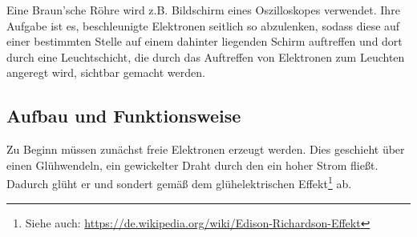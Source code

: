 




%
%	





Eine Braun'sche Röhre wird z.B. Bildschirm eines Oszilloskopes verwendet. Ihre Aufgabe ist es, beschleunigte Elektronen seitlich so abzulenken, sodass diese auf einer bestimmten Stelle auf einem dahinter liegenden Schirm auftreffen und dort durch eine Leuchtschicht, die durch das Auftreffen von Elektronen zum Leuchten angeregt wird, sichtbar gemacht werden.

\subsection{Aufbau und Funktionsweise}

Zu Beginn müssen zunächst freie Elektronen erzeugt werden. Dies geschieht über einen Glühwendeln, ein gewickelter Draht durch den ein hoher Strom fließt. Dadurch glüht er und sondert gemäß dem glühelektrischen Effekt\footnote{Siehe auch: \url{https://de.wikipedia.org/wiki/Edison-Richardson-Effekt}} ab.

